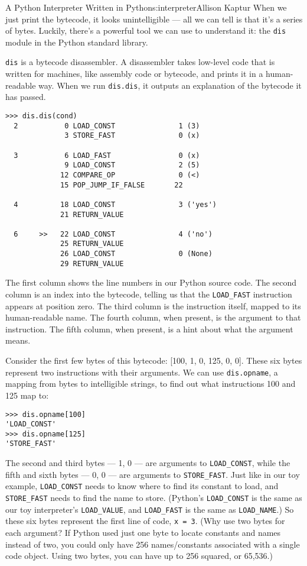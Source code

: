 \begin{aosachapter}{A Python Interpreter Written in Python}{s:interpreter}{Allison Kaptur}
When we just print the bytecode, it looks unintelligible --- all we can
tell is that it's a series of bytes. Luckily, there's a powerful tool we
can use to understand it: the \texttt{dis} module in the Python standard
library.

\texttt{dis} is a bytecode disassembler. A disassembler takes low-level
code that is written for machines, like assembly code or bytecode, and
prints it in a human-readable way. When we run \texttt{dis.dis}, it
outputs an explanation of the bytecode it has passed.

\begin{verbatim}
>>> dis.dis(cond)
  2           0 LOAD_CONST               1 (3)
              3 STORE_FAST               0 (x)

  3           6 LOAD_FAST                0 (x)
              9 LOAD_CONST               2 (5)
             12 COMPARE_OP               0 (<)
             15 POP_JUMP_IF_FALSE       22

  4          18 LOAD_CONST               3 ('yes')
             21 RETURN_VALUE

  6     >>   22 LOAD_CONST               4 ('no')
             25 RETURN_VALUE
             26 LOAD_CONST               0 (None)
             29 RETURN_VALUE
\end{verbatim}

The first column shows the line numbers in our Python source code. The
second column is an index into the bytecode, telling us that the
\texttt{LOAD\_FAST} instruction appears at position zero. The third
column is the instruction itself, mapped to its human-readable name. The
fourth column, when present, is the argument to that instruction. The
fifth column, when present, is a hint about what the argument means.

Consider the first few bytes of this bytecode: {[}100, 1, 0, 125, 0,
0{]}. These six bytes represent two instructions with their arguments.
We can use \texttt{dis.opname}, a mapping from bytes to intelligible
strings, to find out what instructions 100 and 125 map to:

\begin{verbatim}
>>> dis.opname[100]
'LOAD_CONST'
>>> dis.opname[125]
'STORE_FAST'
\end{verbatim}

The second and third bytes --- 1, 0 --- are arguments to
\texttt{LOAD\_CONST}, while the fifth and sixth bytes --- 0, 0 --- are
arguments to \texttt{STORE\_FAST}. Just like in our toy example,
\texttt{LOAD\_CONST} needs to know where to find its constant to load,
and \texttt{STORE\_FAST} needs to find the name to store. (Python's
\texttt{LOAD\_CONST} is the same as our toy interpreter's
\texttt{LOAD\_VALUE}, and \texttt{LOAD\_FAST} is the same as
\texttt{LOAD\_NAME}.) So these six bytes represent the first line of
code, \texttt{x = 3}. (Why use two bytes for each argument? If Python
used just one byte to locate constants and names instead of two, you
could only have 256 names/constants associated with a single code
object. Using two bytes, you can have up to 256 squared, or 65,536.)


\end{aosachapter}
